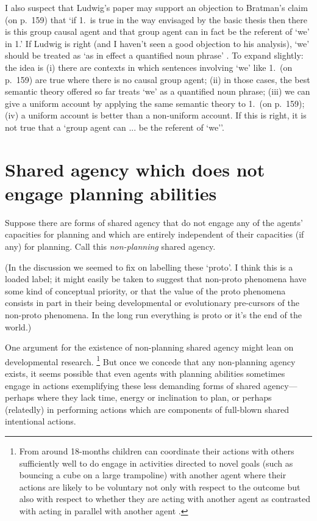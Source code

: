 \documentclass[12pt,letterpaper]{extarticle}
\begin{document}
I also suspect that Ludwig's paper may support an objection to Bratman's claim (on p.\ 159) that `if 1.\ is true in the way envisaged by the basic thesis then there is this group causal agent and that group agent can in fact be the referent of `we' in 1.'
If Ludwig is right (and I haven't seen a good objection to his analysis), `we' should be treated as `as in effect a quantified noun phrase' \citep[p.\ 364]{ludwig_collective_2007}.
To expand slightly: the idea is (i) there are contexts in which sentences involving `we' like 1.\ (on p.\ 159) are true where there is no causal group agent; (ii) in those cases, the best semantic theory offered so far treats `we' as a quantified noun phrase; (iii) we can give a uniform account by applying the same semantic theory to 1.\ (on p.\ 159); (iv) a uniform account is better than a non-uniform account.
If this is right, it is not true that a `group agent can ... be the referent of `we''.



\section{Shared agency which does not engage planning abilities}
\label{nonplanning}

Suppose there are forms of shared agency that do not engage any of the agents' capacities for planning and which are entirely independent of their capacities (if any) for planning.  
Call this \emph{non-planning} shared agency.

(In the discussion we seemed to fix on labelling these `proto'.
I think this is a loaded label; it might easily be taken to suggest that non-proto phenomena have some kind of conceptual priority, or that the value of the proto phenomena consists in part in their being developmental or evolutionary pre-cursors of the non-proto phenomena.
In the long run everything is proto or it's the end of the world.)

One argument for the existence of non-planning shared agency might lean on developmental research.%
%
\footnote{
From around 18-months children can coordinate their actions with others sufficiently well to do engage in activities directed to novel goals (such as bouncing a cube on a large trampoline) with another agent \citep{Warneken:2006qe} where their actions are likely to be voluntary not only with respect to the outcome but also with respect to whether they are acting with another agent as contrasted with acting in parallel with another agent \citep{Grafenhain:2010zl}.
} 
%
But once we concede that any non-planning agency exists, it seems possible that even agents with planning abilities  sometimes engage in actions exemplifying these less demanding forms of shared agency---perhaps where they lack time, energy or inclination to plan, or perhaps (relatedly) in performing actions which are components of full-blown shared intentional actions.
\end{document}

